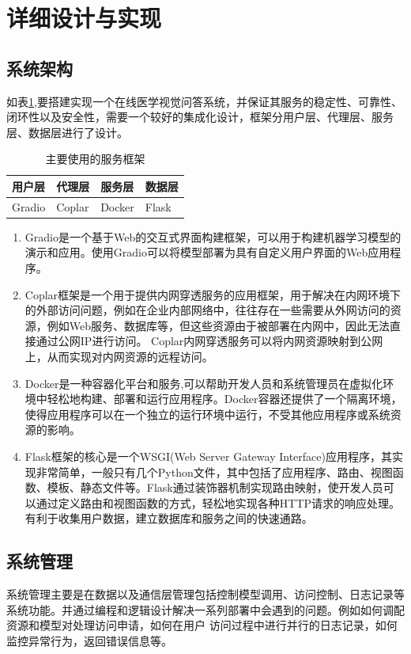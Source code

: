\section{详细设计与实现}
\subsection{系统架构}
如表\ref{tab:sys_lib},要搭建实现一个在线医学视觉问答系统，并保证其服务的稳定性、可靠性、闭环性以及安全性，需要一个较好的集成化设计，框架分用户层、代理层、服务层、数据层进行了设计。

\begin{table}
    \caption{\label{tab:sys_lib}主要使用的服务框架}
    \centering
    \begin{tabular}{llll}
        \hline 用户层 & 代理层 & 服务层 & 数据层 \\
        \hline Gradio & Coplar & Docker & Flask \\
        \hline
        \end{tabular}
\end{table}	
\begin{enumerate}[topsep = 0 pt, itemsep= 0 pt, parsep=0pt, partopsep=0pt, leftmargin=44pt, itemindent=0pt, labelsep=6pt, label=(\arabic*)]
	\item Gradio是一个基于Web的交互式界面构建框架，可以用于构建机器学习模型的演示和应用。使用Gradio可以将模型部署为具有自定义用户界面的Web应用程序。
	\item Coplar框架是一个用于提供内网穿透服务的应用框架，用于解决在内网环境下的外部访问问题，例如在企业内部网络中，往往存在一些需要从外网访问的资源，例如Web服务、数据库等，但这些资源由于被部署在内网中，因此无法直接通过公网IP进行访问。
	Coplar内网穿透服务可以将内网资源映射到公网上，从而实现对内网资源的远程访问。
	\item Docker是一种容器化平台和服务,可以帮助开发人员和系统管理员在虚拟化环境中轻松地构建、部署和运行应用程序。Docker容器还提供了一个隔离环境，使得应用程序可以在一个独立的运行环境中运行，不受其他应用程序或系统资源的影响。
	\item Flask框架的核心是一个WSGI(Web Server Gateway Interface)应用程序，其实现非常简单，一般只有几个Python文件，其中包括了应用程序、路由、视图函数、模板、静态文件等。Flask通过装饰器机制实现路由映射，使开发人员可以通过定义路由和视图函数的方式，轻松地实现各种HTTP请求的响应处理。
	有利于收集用户数据，建立数据库和服务之间的快速通路。
\end{enumerate}

\subsection{系统管理}
系统管理主要是在数据以及通信层管理包括控制模型调用、访问控制、日志记录等系统功能。并通过编程和逻辑设计解决一系列部署中会遇到的问题。例如如何调配资源和模型对处理访问申请，如何在用户
访问过程中进行并行的日志记录，如何监控异常行为，返回错误信息等。

